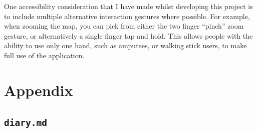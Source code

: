 \documentclass{final_report}
\begin{document}
One accessibility consideration that I have made whilst developing this project is to include multiple alternative interaction gestures where possible. For example, when zooming the map, you can pick from either the two finger ``pinch'' zoom gesture, or alternatively a single finger tap and hold. This allows people with the ability to use only one hand, such as amputees, or walking stick users, to make full use of the application.






\clearpage
\chapter{Appendix}

\section{\texttt{diary.md}}




\renewcommand*{\bibfont}{\normalfont\small}
\printbibliography{}
\end{document}
